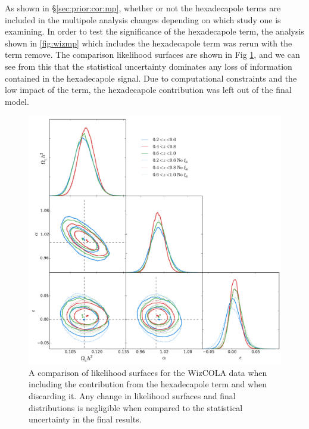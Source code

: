 \documentclass[titlesmallcaps, examinerscopy, copyrightpage]{uqthesis}
\begin{document}
As shown in \S\ref{sec:prior:cor:mp}, whether or not the hexadecapole terms are included in the multipole analysis changes depending on which study one is examining. In order to test the significance of the hexadecapole term, the analysis shown in \ref{fig:wizmp} which includes the hexadecapole term was rerun with the term remove. The comparison likelihood surfaces are shown in Fig \ref{fig:wizmpfastComp}, and we can see from this that the statistical uncertainty dominates any loss of information contained in the hexadecapole signal. Due to computational constraints and the low impact of the term, the hexadecapole contribution was left out of the final model.

\begin{figure}[h!]
  \begin{center}
    \includegraphics[width=\textwidth]{images/wizmpfastComp.pdf}
  \end{center}
  \caption{A comparison of likelihood surfaces for the WizCOLA data when including the contribution from the hexadecapole term and when discarding it. Any change in likelihood surfaces and final distributions is negligible when compared to the statistical uncertainty in the final results.}
  \label{fig:wizmpfastComp}
\end{figure}
\end{document}
